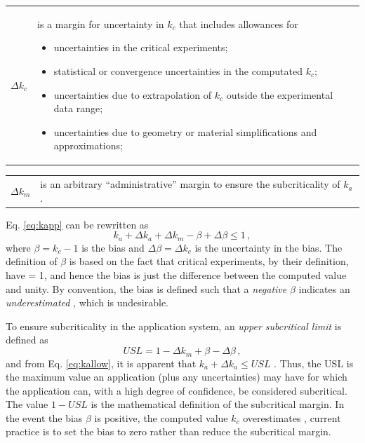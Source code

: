 \begin{tabular}{rp{10cm}}
 $\Delta k_c$    & is a margin for uncertainty in $k_c$ that includes 
                   allowances for
                 \begin{itemize}
                   \item uncertainties in the critical experiments;
                   \item statistical or convergence uncertainties
                         in the computated $k_c$;
                   \item uncertainties due to extrapolation of $k_c$ 
                         outside the experimental data range;
                   \item uncertainties due to geometry or material
                         simplifications and approximations;
                 \end{itemize}
\end{tabular}

\begin{tabular}{rp{12cm}}
 $\Delta k_m$    & is an arbitrary ``administrative'' 
                   margin to ensure the subcriticality 
                   of $k_a$. \\
\end{tabular}

Eq. \ref{eq:kapp} can be rewritten as
\begin{equation}
 k_a + \Delta k_a + \Delta k_m - \beta + \Delta \beta \leq 1 \, ,
\label{eq:kallow}
\end{equation}
where $\beta = k_c - 1$ is the bias and $\Delta \beta = \Delta k_c$ is the 
uncertainty in the bias.  The definition of $\beta$ is based on the fact 
that critical experiments, by their definition, have \keff = 1, and hence 
the bias is just the difference between the computed value and unity.  By 
convention, the bias is defined such that a \textit{ negative} $\beta$ 
indicates an \textit{ underestimated} \keff\!, which is undesirable.

To ensure subcriticality in the application system, an \textit{ upper 
subcritical limit} is defined as
\begin{equation}
 USL = 1 - \Delta k_m + \beta - \Delta \beta \, ,
\label{eq:usl}
\end{equation}
and from Eq. \ref{eq:kallow}, it is apparent that $k_a + \Delta k_a \leq USL$ 
\cite{lichtenwalter1997cbg}.   Thus, the USL is the maximum value an 
application \keff (plus any uncertainties) may have for which the 
application can, with a high degree of confidence, be considered 
subcritical.  The value $1 - USL$  is the mathematical definition of the 
subcritical margin.  In the event the bias $\beta$ is positive, \ie the 
computed value $k_c$ overestimates \keff\!, current practice is to set 
the bias to zero rather than reduce the subcritical margin.

